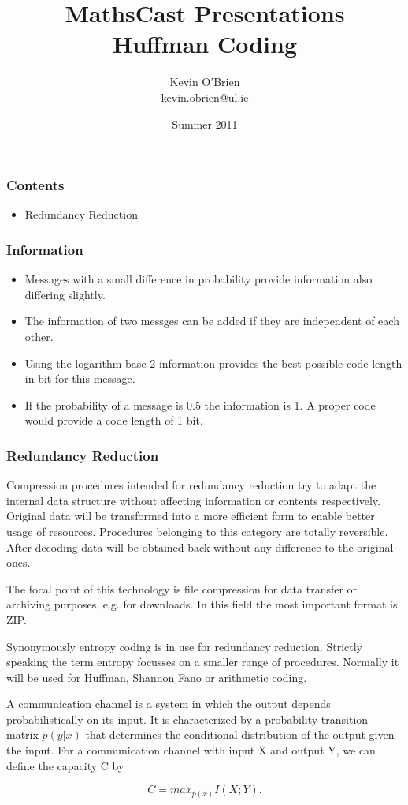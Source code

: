 \documentclass[a4]{beamer}
\title[MathsCast]{MathsCast Presentations \\ {\normalsize Huffman Coding}}
\author[Kevin O'Brien]{Kevin O'Brien \\ {\scriptsize kevin.obrien@ul.ie}}
\date{Summer 2011}
\institute[Maths \& Stats]{Dept. of Mathematics \& Statistics, \\ University \textit{of} Limerick}
\begin{document}
\begin{frame}
\frametitle{Contents}
\large
\begin{itemize}
\item Redundancy Reduction
\end{itemize}
\end{frame}

\begin{frame}
\frametitle{Information}
\begin{itemize}
\item Messages with a small difference in probability provide information also differing slightly. 
\item The information of two messges can be added if they are independent of each other.
\item Using the logarithm base 2 information provides the best possible code length in bit for this message. 
\item If the probability of a message is 0.5 the information is 1. A proper code would provide a code length of 1 bit. 
\end{itemize}
\end{frame}



\begin{frame}

\frametitle{Redundancy Reduction}

Compression procedures intended for redundancy reduction try to adapt the internal data structure without affecting information or contents respectively. Original data will be transformed into a more efficient form to enable better usage of resources. Procedures belonging to this category are totally reversible. After decoding data will be obtained back without any difference to the original ones.

The focal point of this technology is file compression for data transfer or archiving purposes, e.g. for downloads. In this field the most important format is ZIP.

Synonymously entropy coding is in use for redundancy reduction. Strictly speaking the term entropy focusses on a smaller range of procedures. Normally it will be used for Huffman, Shannon Fano or arithmetic coding.

\end{frame}
\begin{frame}


A communication channel is a system in which the output depends
probabilistically on its input. It is characterized by a probability transition
matrix $p(y|x)$ that determines the conditional distribution of the output
given the input. For a communication channel with input X and output
Y, we can define the capacity C by




\[C = max_{p(x)} I (X; Y).\]




\end{frame}
\end{document}
